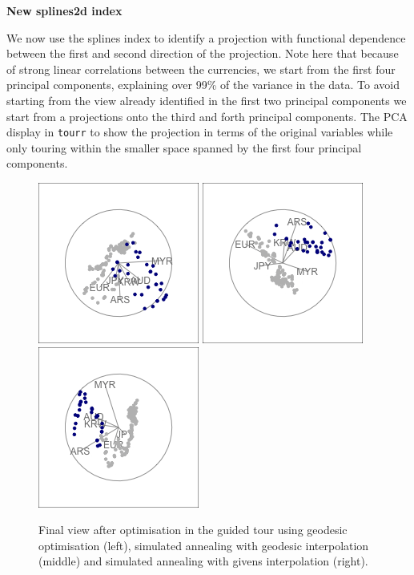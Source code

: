 \textbf{New splines2d index}

We now use the splines index to identify a projection with functional
dependence between the first and second direction of the projection.
Note here that because of strong linear correlations between the
currencies, we start from the first four principal components,
explaining over 99\% of the variance in the data. To avoid starting from
the view already identified in the first two principal components we
start from a projections onto the third and forth principal components.
The PCA display in \texttt{tourr} to show the projection in terms of the
original variables while only touring within the smaller space spanned
by the first four principal components.

\begin{Schunk}
\begin{figure}

{\centering \includegraphics[width=0.3\linewidth]{rates_tour_geodesic_final} \includegraphics[width=0.3\linewidth]{rates_tour_better_final} \includegraphics[width=0.3\linewidth]{rates_tour_givens_final} 

}

\caption[Final view after optimisation in the guided tour using geodesic optimisation (left), simulated annealing with geodesic interpolation (middle) and simulated annealing with givens interpolation (right)]{Final view after optimisation in the guided tour using geodesic optimisation (left), simulated annealing with geodesic interpolation (middle) and simulated annealing with givens interpolation (right).}\label{fig:rates-tour-static}
\end{figure}
\end{Schunk}

